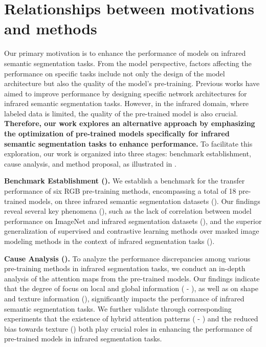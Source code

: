 \section{Relationships between motivations and methods}
\label{app:relationship}

Our primary motivation is to enhance the performance of models on infrared semantic segmentation tasks. From the model perspective, factors affecting the performance on specific tasks include not only the design of the model architecture but also the quality of the model's pre-training. Previous works \citep{soda, tinn} have aimed to improve performance by designing specific network architectures for infrared semantic segmentation tasks. However, in the infrared domain, where labeled data is limited, the quality of the pre-trained model is also crucial. \textbf{Therefore, our work explores an alternative approach by emphasizing the optimization of pre-trained models specifically for infrared semantic segmentation tasks to enhance performance.} To facilitate this exploration, our work is organized into three stages: benchmark establishment, cause analysis, and method proposal, as illustrated in .

\textbf{Benchmark Establishment ().} We establish a benchmark for the transfer performance of six RGB pre-training methods, encompassing a total of 18 pre-trained models, on three infrared semantic segmentation datasets (). Our findings reveal several key phenomena (), such as the lack of correlation between model performance on ImageNet and infrared segmentation datasets (), and the superior generalization of supervised and contrastive learning methods over masked image modeling methods in the context of infrared segmentation tasks (). 

\textbf{Cause Analysis ().} To analyze the performance discrepancies among various pre-training methods in infrared segmentation tasks, we conduct an in-depth analysis of the attention maps from the pre-trained models. Our findings indicate that the degree of focus on local and global information ( - ), as well as on shape and texture information (), significantly impacts the performance of infrared semantic segmentation tasks. We further validate through corresponding experiments that the existence of hybrid attention patterns ( - ) and the reduced bias towards texture () both play crucial roles in enhancing the performance of pre-trained models in infrared segmentation tasks.

